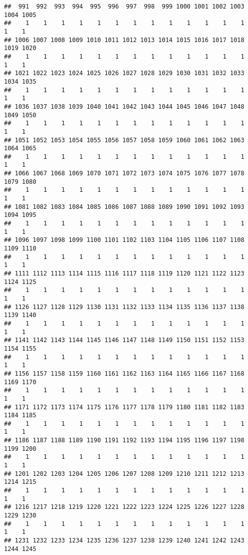 \documentclass[]{article}
\begin{document}
\begin{verbatim}
##  991  992  993  994  995  996  997  998  999 1000 1001 1002 1003 1004 1005 
##    1    1    1    1    1    1    1    1    1    1    1    1    1    1    1 
## 1006 1007 1008 1009 1010 1011 1012 1013 1014 1015 1016 1017 1018 1019 1020 
##    1    1    1    1    1    1    1    1    1    1    1    1    1    1    1 
## 1021 1022 1023 1024 1025 1026 1027 1028 1029 1030 1031 1032 1033 1034 1035 
##    1    1    1    1    1    1    1    1    1    1    1    1    1    1    1 
## 1036 1037 1038 1039 1040 1041 1042 1043 1044 1045 1046 1047 1048 1049 1050 
##    1    1    1    1    1    1    1    1    1    1    1    1    1    1    1 
## 1051 1052 1053 1054 1055 1056 1057 1058 1059 1060 1061 1062 1063 1064 1065 
##    1    1    1    1    1    1    1    1    1    1    1    1    1    1    1 
## 1066 1067 1068 1069 1070 1071 1072 1073 1074 1075 1076 1077 1078 1079 1080 
##    1    1    1    1    1    1    1    1    1    1    1    1    1    1    1 
## 1081 1082 1083 1084 1085 1086 1087 1088 1089 1090 1091 1092 1093 1094 1095 
##    1    1    1    1    1    1    1    1    1    1    1    1    1    1    1 
## 1096 1097 1098 1099 1100 1101 1102 1103 1104 1105 1106 1107 1108 1109 1110 
##    1    1    1    1    1    1    1    1    1    1    1    1    1    1    1 
## 1111 1112 1113 1114 1115 1116 1117 1118 1119 1120 1121 1122 1123 1124 1125 
##    1    1    1    1    1    1    1    1    1    1    1    1    1    1    1 
## 1126 1127 1128 1129 1130 1131 1132 1133 1134 1135 1136 1137 1138 1139 1140 
##    1    1    1    1    1    1    1    1    1    1    1    1    1    1    1 
## 1141 1142 1143 1144 1145 1146 1147 1148 1149 1150 1151 1152 1153 1154 1155 
##    1    1    1    1    1    1    1    1    1    1    1    1    1    1    1 
## 1156 1157 1158 1159 1160 1161 1162 1163 1164 1165 1166 1167 1168 1169 1170 
##    1    1    1    1    1    1    1    1    1    1    1    1    1    1    1 
## 1171 1172 1173 1174 1175 1176 1177 1178 1179 1180 1181 1182 1183 1184 1185 
##    1    1    1    1    1    1    1    1    1    1    1    1    1    1    1 
## 1186 1187 1188 1189 1190 1191 1192 1193 1194 1195 1196 1197 1198 1199 1200 
##    1    1    1    1    1    1    1    1    1    1    1    1    1    1    1 
## 1201 1202 1203 1204 1205 1206 1207 1208 1209 1210 1211 1212 1213 1214 1215 
##    1    1    1    1    1    1    1    1    1    1    1    1    1    1    1 
## 1216 1217 1218 1219 1220 1221 1222 1223 1224 1225 1226 1227 1228 1229 1230 
##    1    1    1    1    1    1    1    1    1    1    1    1    1    1    1 
## 1231 1232 1233 1234 1235 1236 1237 1238 1239 1240 1241 1242 1243 1244 1245 

\end{verbatim}
\end{document}
